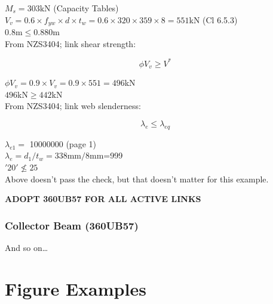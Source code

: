 \documentclass[12pt,a4paper]{article} %
\newcommand{\tab}{\hspace*{2em}} %
\begin{document}
\tab $M_s=303\mathrm{kN}$ (Capacity Tables) \\[8pt]
\tab $V_v=0.6 \times f_{yw} \times d \times t_w = 0.6 \times 320 \times 359 \times 8 = 551$kN (Cl 6.5.3) \\[8pt]
\tab $0.8$m$\leqslant0.880$m  \\

From NZS3404; link shear strength:

\begin{equation*}
\tag{Cl 6.5.3}
\phi V_v \geqslant V^*
\end{equation*}

\tab $\phi V_v=0.9\times V_v=0.9\times551=496$kN \\[8pt]
\tab $496$kN$\geqslant442$kN  \\

From NZS3404; link web slenderness:

\begin{equation*}
\tag{Cl 12.8.3}
\lambda_e \leqslant \lambda_{eq}
\end{equation*}

\tab $\lambda_{e1}=$ 10000000 (page 1) \\[8pt]
\tab $\lambda_e=d_1/t_w=338$mm$/8$mm=999\\[8pt]
\tab $'20' \nleqslant 25$  \\

Above doesn't pass the check, but that doesn't matter for this example.
\par\vspace{\baselineskip}

\begin{center}
\textbf{ADOPT 360UB57 FOR ALL ACTIVE LINKS} \\
\end{center}

\subsubsection{Collector Beam (360UB57)}
And so on\dots


\section{Figure Examples}
\end{document}
